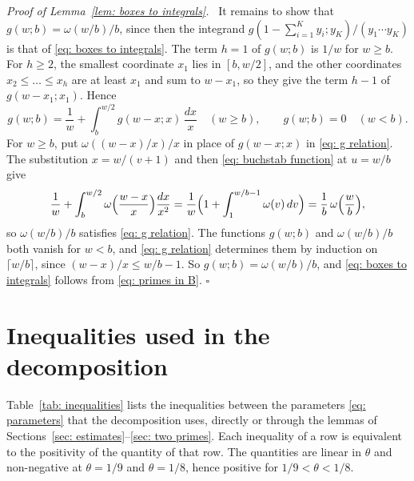 \documentclass{article}
\numberwithin{equation}{section}
\newenvironment{proof}[1][Proof]{\par\medskip\noindent\textit{#1.}\ }{\hfill$\square$\par\medskip}
\newcommand{\Le}{\leqslant}
\newcommand{\Ge}{\geqslant}
\begin{document}
\begin{proof}[Proof of Lemma~\ref{lem: boxes to integrals}]
It remains to show that $g(w; b) = \omega(w/b)/b$, since then the integrand $g(1 - \sum_{i=1}^{K} y_i; y_K)/(y_1 \cdots y_K)$ is that of \eqref{eq: boxes to integrals}. The term $h = 1$ of $g(w; b)$ is $1/w$ for $w \Ge b$. For $h \Ge 2$, the smallest coordinate $x_1$ lies in $[b, w/2]$, and the other coordinates $x_2 \Le \dots \Le x_h$ are at least $x_1$ and sum to $w - x_1$, so they give the term $h - 1$ of $g(w - x_1; x_1)$. Hence
\begin{equation}
\label{eq: g relation}
g(w; b) = \frac{1}{w} + \int_b^{w/2} g(w - x; x)\, \frac{dx}{x} \quad (w \Ge b), \qquad g(w; b) = 0 \quad (w < b).
\end{equation}
For $w \Ge b$, put $\omega((w - x)/x)/x$ in place of $g(w - x; x)$ in \eqref{eq: g relation}. The substitution $x = w/(v + 1)$ and then \eqref{eq: buchstab function} at $u = w/b$ give
\begin{equation*}
\frac{1}{w} + \int_b^{w/2} \omega\Bigl( \frac{w - x}{x} \Bigr) \frac{dx}{x^2} = \frac{1}{w} \Bigl( 1 + \int_1^{w/b - 1} \omega(v)\, dv \Bigr) = \frac{1}{b}\, \omega\Bigl( \frac{w}{b} \Bigr),
\end{equation*}
so $\omega(w/b)/b$ satisfies \eqref{eq: g relation}.
The functions $g(w; b)$ and $\omega(w/b)/b$ both vanish for $w < b$, and \eqref{eq: g relation} determines them by induction on $\lceil w/b \rceil$, since $(w - x)/x \Le w/b - 1$. So $g(w; b) = \omega(w/b)/b$, and \eqref{eq: boxes to integrals} follows from \eqref{eq: primes in B}.
\end{proof}

\section{Inequalities used in the decomposition}
\label{app: inequalities}

Table~\ref{tab: inequalities} lists the inequalities between the parameters \eqref{eq: parameters} that the decomposition uses, directly or through the lemmas of Sections~\ref{sec: estimates}--\ref{sec: two primes}. Each inequality of a row is equivalent to the positivity of the quantity of that row. The quantities are linear in $\theta$ and non-negative at $\theta = 1/9$ and $\theta = 1/8$, hence positive for $1/9 < \theta < 1/8$.
\end{document}
